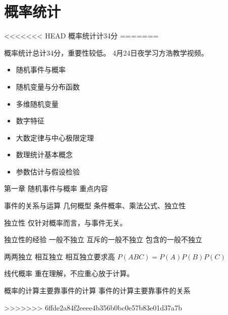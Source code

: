 \chapter{概率统计}
<<<<<<< HEAD
概率统计计34分
=======

概率统计总计34分，重要性较低。
4月24日夜学习方浩教学视频。

\begin{itemize}
	\item 随机事件与概率
	\item 随机变量与分布函数
	\item 多维随机变量
	\item 数字特征
	\item 大数定律与中心极限定理
	\item 数理统计基本概念
	\item 参数估计与假设检验
\end{itemize}


第一章 随机事件与概率
重点内容

事件的关系与运算
几何概型
条件概率、乘法公式、独立性

独立性
仅针对概率而言，与事件无关。

独立性的经验
一般不独立
互斥的一般不独立
包含的一般不独立

两两独立  
相互独立
相互独立要求高 $P(ABC) = P(A)P(B)P(C)$

线代概率 重在理解，不应重心放于计算。


概率的计算主要靠事件的计算
事件的计算主要靠事件的关系

>>>>>>> 6ffde2a84f2eeee4b356b0bc0e57b83e01d37a7b
